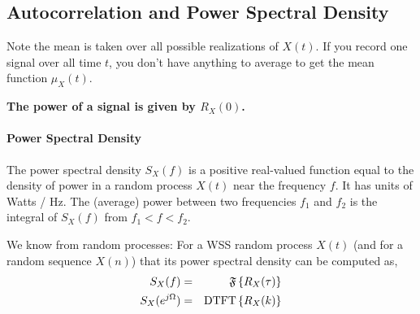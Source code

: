 \subsection{Autocorrelation and Power Spectral Density}


Note the mean is taken over all possible realizations of $X(t)$.  If you record one signal over all time $t$, you don't have anything to average to get the mean function $\mu_X(t)$.


\textbf{The power of a signal is given by $R_X(0)$.}


\paragraph{Power Spectral Density}

The power spectral density $S_X(f)$ is a positive real-valued function equal to the density of power in a random process $X(t)$ near the frequency $f$.  It has units of Watts / Hz.  The (average) power between two frequencies $f_1$ and $f_2$ is the integral of $S_X(f)$ from $f_1 < f < f_2$. 

We know from random processes:  For a WSS random process $X(t)$ (and for a random
sequence $X(n)$) that its power spectral density can be computed as,
\begin{eqnarray}
  S_X(f) &=& {\mathfrak{F}\left\{ {R_X(\tau)}\right\}} \nonumber \\ 
  S_X(e^{j\Omega}) &=& {\mathrm{DTFT}\left\{ {R_X(k)}\right\}} \nonumber
\end{eqnarray}

